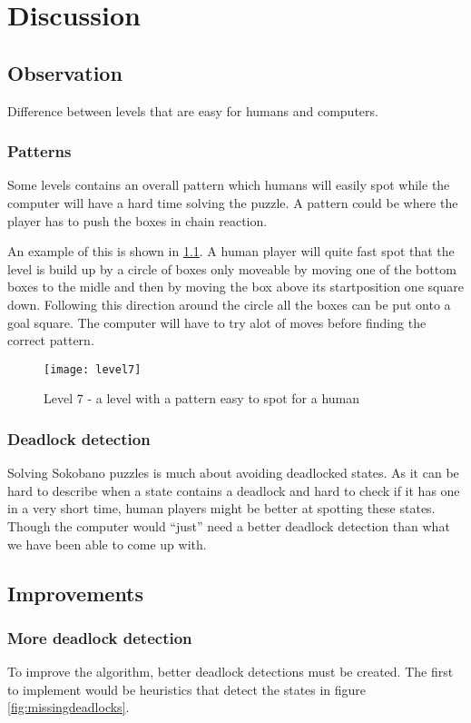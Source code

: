 
\chapter{Discussion}
\label{cha:discussion}

\section{Observation}
Difference between levels that are easy for humans and computers.

\subsection{Patterns}
Some levels contains an overall pattern which humans will easily spot while the computer will have a hard time solving the puzzle. A pattern could be where the player has to push the boxes in chain reaction.

An example of this is shown in \ref{fig:level7}. A human player will quite fast spot that the level is build up by a circle of boxes only moveable by moving one of the bottom boxes to the midle and then by moving the box above its startposition one square down. Following this direction around the circle all the boxes can be put onto a goal square. The computer will have to try alot of moves before finding the correct pattern.

\begin{figure}[htp]
	\centering
	\texttt{[image: level7]}
	\caption{Level 7 - a level with a pattern easy to spot for a human}
	\label{fig:level7}
\end{figure}

\subsection{Deadlock detection}
Solving Sokobano puzzles is much about avoiding deadlocked states. As
it can be hard to describe when a state contains a deadlock and hard
to check if it has one in a very short time, human players might be
better at spotting these states. Though the computer would ``just''
need a better deadlock detection than what we have been able to come
up with.

\section{Improvements}
\subsection{More deadlock detection}
To improve the algorithm, better deadlock detections must be
created. The first to implement would be heuristics that detect the
states in figure \ref{fig:missingdeadlocks}.

